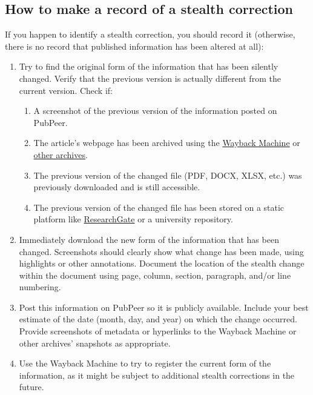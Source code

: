 \documentclass[letterpaper, 12pt]{article}
\begin{document}
\subsection*{How to make a record of a stealth correction}

If you happen to identify a stealth correction, you should record it (otherwise, there is no record that published information has been altered at all):

\begin{enumerate}
    \setlength\itemsep{-0.5em}
    \item Try to find the original form of the information that has been silently changed. Verify that the previous version is actually different from the current version. Check if:
    \begin{enumerate}
        \setlength\itemsep{-0.5em}
        \item A screenshot of the previous version of the information posted on PubPeer. 
        \item The article's webpage has been archived using the \href{https://web.archive.org/}{Wayback Machine} or \href{https://archive.today/}{other archives}.
        \item The previous version of the changed file (PDF, DOCX, XLSX, etc.) was previously downloaded and is still accessible.
        \item The previous version of the changed file has been stored on a static platform like \href{https://www.researchgate.net/}{ResearchGate} or a university repository.
    \end{enumerate}
    
    \item Immediately download the new form of the information that has been changed. Screenshots should clearly show what change has been made, using highlights or other annotations. Document the location of the stealth change within the document using page, column, section, paragraph, and/or line numbering.
    
    \item Post this information on PubPeer so it is publicly available. Include your best estimate of the date (month, day, and year) on which the change occurred. Provide screenshots of metadata or hyperlinks to the Wayback Machine or other archives' snapshots as appropriate.
    
    \item Use the Wayback Machine to try to register the current form of the information, as it might be subject to additional stealth corrections in the future.
    

\end{enumerate}
\end{document}
